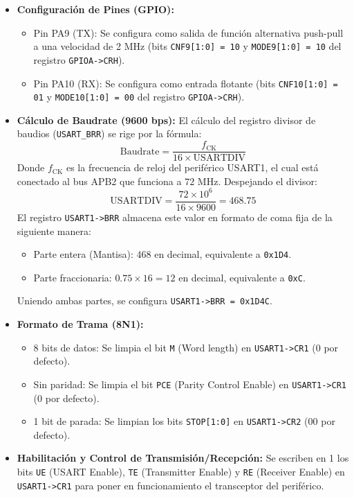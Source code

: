 \documentclass{plantilla}
\begin{document}
\begin{itemize}
    \item \textbf{Configuración de Pines (GPIO):}
    \begin{itemize}
        \item Pin PA9 (TX): Se configura como salida de función alternativa push-pull a una velocidad de 2 MHz (bits \texttt{CNF9[1:0] = 10} y \texttt{MODE9[1:0] = 10} del registro \texttt{GPIOA-\textgreater{}CRH}).
        \item Pin PA10 (RX): Se configura como entrada flotante (bits \texttt{CNF10[1:0] = 01} y \texttt{MODE10[1:0] = 00} del registro \texttt{GPIOA-\textgreater{}CRH}).
    \end{itemize}
    
    \item \textbf{Cálculo de Baudrate (9600 bps):}
    El cálculo del registro divisor de baudios (\texttt{USART\_BRR}) se rige por la fórmula:
    \[ \text{Baudrate} = \frac{f_{\text{CK}}}{16 \times \text{USARTDIV}} \]
    Donde $f_{\text{CK}}$ es la frecuencia de reloj del periférico USART1, el cual está conectado al bus APB2 que funciona a $72\text{ MHz}$. Despejando el divisor:
    \[ \text{USARTDIV} = \frac{72 \times 10^6}{16 \times 9600} = 468.75 \]
    El registro \texttt{USART1-\textgreater{}BRR} almacena este valor en formato de coma fija de la siguiente manera:
    \begin{itemize}
        \item Parte entera (Mantisa): $468$ en decimal, equivalente a \texttt{0x1D4}.
        \item Parte fraccionaria: $0.75 \times 16 = 12$ en decimal, equivalente a \texttt{0xC}.
    \end{itemize}
    Uniendo ambas partes, se configura \texttt{USART1-\textgreater{}BRR = 0x1D4C}.
    
    \item \textbf{Formato de Trama (8N1):}
    \begin{itemize}
        \item 8 bits de datos: Se limpia el bit \texttt{M} (Word length) en \texttt{USART1-\textgreater{}CR1} (0 por defecto).
        \item Sin paridad: Se limpia el bit \texttt{PCE} (Parity Control Enable) en \texttt{USART1-\textgreater{}CR1} (0 por defecto).
        \item 1 bit de parada: Se limpian los bits \texttt{STOP[1:0]} en \texttt{USART1-\textgreater{}CR2} (00 por defecto).
    \end{itemize}
    
    \item \textbf{Habilitación y Control de Transmisión/Recepción:}
    Se escriben en 1 los bits \texttt{UE} (USART Enable), \texttt{TE} (Transmitter Enable) y \texttt{RE} (Receiver Enable) en \texttt{USART1-\textgreater{}CR1} para poner en funcionamiento el transceptor del periférico.
\end{itemize}
\end{document}
